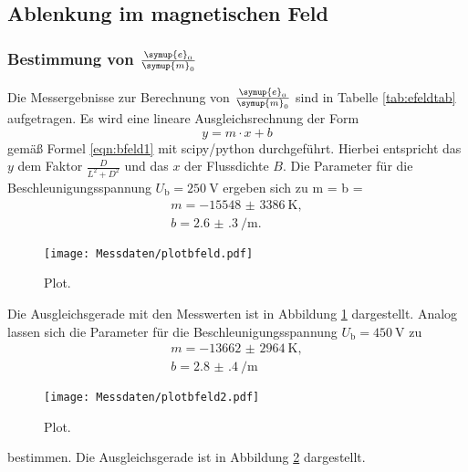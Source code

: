 
\FloatBarrier
\subsection{Ablenkung im magnetischen Feld}

\subsubsection{Bestimmung von $\frac{\symup{e}_0}{\symup{m}_0}$}
Die Messergebnisse zur Berechnung von $\frac{\symup{e}_0}{\symup{m}_0}$ sind in Tabelle
\ref{tab:efeldtab} aufgetragen. Es wird eine lineare Ausgleichsrechnung der Form
\begin{equation*}
	y = m \cdot x + b
\end{equation*}
gemäß Formel \eqref{eqn:bfeld1} mit scipy/python \cite{scipy} durchgeführt. Hierbei entspricht das
$y$ dem Faktor $\frac{D}{L^2+D^2}$ und das $x$ der Flussdichte $B$.
Die Parameter für die Beschleunigungsspannung $U_{\mathrm{b}}=\SI{250}{\volt}$ ergeben sich zu
m = b =  \begin{gather*}
	m = -\SI{15548(3386)}{\kelvin} \mathrm{,} \\
	b = \SI{2.6(3)}{\per\meter} \mathrm{.}
\end{gather*}
\begin{figure}
  \centering
  \texttt{[image: Messdaten/plotbfeld.pdf]}
  \caption{Plot.}
  \label{fig:bfeldplot}
\end{figure}
Die Ausgleichsgerade mit den Messwerten ist in Abbildung \ref{fig:bfeldplot} dargestellt.
Analog lassen sich die Parameter für die Beschleunigungsspannung $U_{\mathrm{b}}=\SI{450}{\volt}$
zu
\begin{gather*}
	m = -\SI{13662(2964)}{\kelvin} \mathrm{,} \\
	b = \SI{2.8(4)}{\per\meter}
\end{gather*}
\begin{figure}
  \centering
  \texttt{[image: Messdaten/plotbfeld2.pdf]}
  \caption{Plot.}
  \label{fig:bfeldplot2}
\end{figure}
bestimmen. Die Ausgleichsgerade ist in Abbildung \ref{fig:bfeldplot2} dargestellt.
